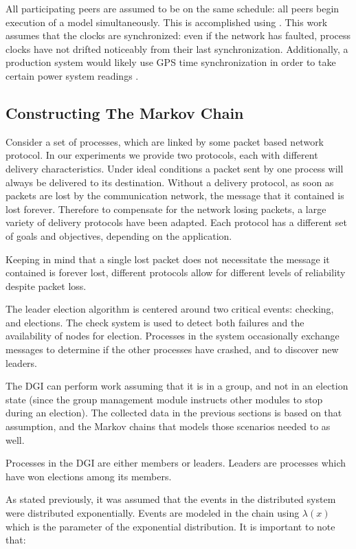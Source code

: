 All participating peers are assumed to be on the same schedule: all
peers begin execution of a model simultaneously. This is accomplished using \cite{DCS}.
This work assumes that the clocks are synchronized: even if the network has faulted,
process clocks have not drifted noticeably from their last synchronization. Additionally,
a production system would likely use GPS time synchronization in order to take
certain power system readings \cite{PHASORREADINGS}.

\subsection{Constructing The Markov Chain}

Consider a set of processes, which are linked by some packet based network
protocol. In our experiments we provide two protocols, each with different
delivery characteristics. Under ideal conditions a packet sent by one process
will always be delivered to its destination. Without a delivery protocol, as
soon as packets are lost by the communication network, the message that it
contained is lost forever. Therefore to compensate for the network losing
packets, a large variety of delivery protocols have been adapted. Each protocol
has a different set of goals and objectives, depending on the application.

Keeping in mind that a single lost packet does not necessitate the message it
contained is forever lost, different protocols allow for different levels of
reliability despite packet loss.

The leader election algorithm is centered around two critical events: checking,
and elections. The check system is used to detect both failures and the
availability of nodes for election. Processes in the system occasionally exchange
messages to determine if the other processes have crashed, and to discover new
leaders.

The DGI can perform work assuming that it is in a group, and not in an election
state (since the group management module instructs other modules to stop during
an election). The collected data in the previous sections is based on that
assumption, and the Markov chains that models those scenarios needed to as
well.

Processes in the DGI are either members or leaders. Leaders are processes
which have won elections among its members.

As stated previously, it was assumed that the events in the distributed system
were distributed exponentially. Events are modeled in the chain
using $\lambda(x)$ which is the parameter of the exponential distribution. It
is important to note that:

